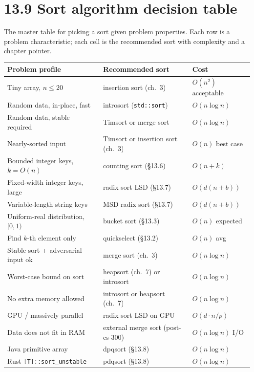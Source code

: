\documentclass[11pt]{article}
\begin{document}
\section{13.9 Sort algorithm decision table}

The master table for picking a sort given problem properties.
Each row is a problem characteristic; each cell is the
recommended sort with complexity and a chapter pointer.

\begin{center}
\begin{tabular}{lll}
\hline
Problem profile & Recommended sort & Cost \\
\hline
Tiny array, $n \le 20$ & insertion sort (ch.~3) & $O(n^2)$ acceptable \\
Random data, in-place, fast & introsort (\texttt{std::sort}) & $O(n \log n)$ \\
Random data, stable required & Timsort or merge sort & $O(n \log n)$ \\
Nearly-sorted input & Timsort or insertion sort (ch.~3) & $O(n)$ best case \\
Bounded integer keys, $k = O(n)$ & counting sort (\S13.6) & $O(n + k)$ \\
Fixed-width integer keys, large & radix sort LSD (\S13.7) & $O(d(n + b))$ \\
Variable-length string keys & MSD radix sort (\S13.7) & $O(d(n + b))$ \\
Uniform-real distribution, $[0,1)$ & bucket sort (\S13.3) & $O(n)$ expected \\
Find $k$-th element only & quickselect (\S13.2) & $O(n)$ avg \\
Stable sort + adversarial input ok & merge sort (ch.~3) & $O(n \log n)$ \\
Worst-case bound on sort & heapsort (ch.~7) or introsort & $O(n \log n)$ \\
No extra memory allowed & introsort or heapsort (ch.~7) & $O(n \log n)$ \\
GPU / massively parallel & radix sort LSD on GPU & $O(d \cdot n / p)$ \\
Data does not fit in RAM & external merge sort (post-cs-300) & $O(n \log n)$ I/O \\
Java primitive array & dpqsort (\S13.8) & $O(n \log n)$ \\
Rust \texttt{[T]::sort\_unstable} & pdqsort (\S13.8) & $O(n \log n)$ \\
\hline
\end{tabular}
\end{center}
\end{document}
